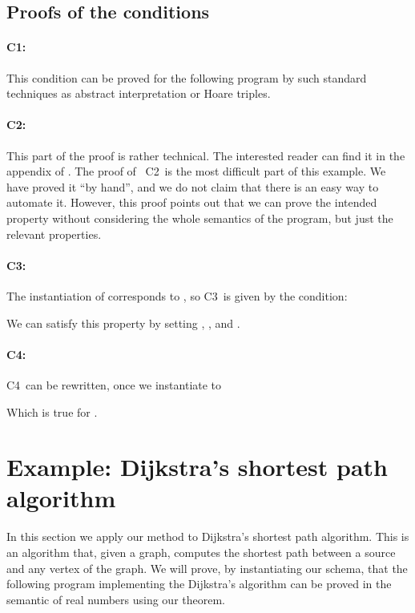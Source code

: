 \documentclass[copyright,creativecommons]{eptcs}
\newcommand{\Cone}{C1}
\newcommand{\Ctwo}{C2}
\newcommand{\Cthree}{C3}
\newcommand{\Cfour}{C4}
\begin{document}
\subsection{Proofs of the conditions}

\paragraph{\Cone: }
This condition can be proved for the following program by such standard
techniques as abstract interpretation or Hoare triples.

{}


\paragraph{\Ctwo: 
}
This part of the proof is rather technical. The interested reader can
find it in the appendix of \cite{gazeau12hal}. 
The proof of ~\Ctwo \, is the most difficult part of this example. We have proved it ``by hand'', and we do not
claim that there is an easy way to automate it.  
However, this proof points out that  we can prove
the intended property  without considering the whole semantics of the program,  but
just the relevant properties. 

\paragraph{\Cthree: }
The instantiation of  corresponds to , so \Cthree\, is given by the condition:

We can satisfy this property by setting , , and
.

\paragraph{\Cfour: }
\Cfour \, can be rewritten, once we instantiate  to 

Which is true for .



\section{Example: Dijkstra's shortest path algorithm}\label{sec:dijkstra}

In this section we apply our method   to Dijkstra's shortest path algorithm. This is an algorithm that, given a graph, 
computes the shortest path between a source and any vertex of the
graph. We will prove, by instantiating our schema,  that the following program  implementing the Dijkstra's algorithm can be proved 
in the semantic of real numbers using our theorem. 
\end{document}
